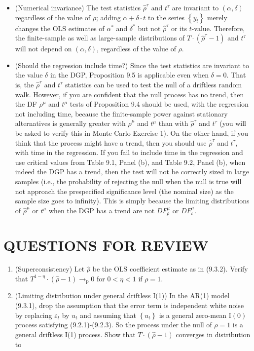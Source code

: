 \documentclass[10pt]{article}
\begin{document}
\begin{itemize}
  \item (Numerical invariance) The test statistics $\hat{\rho}^{\tau}$ and $t^{\tau}$ are invariant to $(\alpha, \delta)$ regardless of the value of $\rho$; adding $\alpha+\delta \cdot t$ to the series $\left\{y_{t}\right\}$ merely changes the OLS estimates of $\alpha^{*}$ and $\delta^{*}$ but not $\hat{\rho}^{\tau}$ or its $t$-value. Therefore, the finite-sample as well as large-sample distributions of $T \cdot\left(\hat{\rho}^{\tau}-1\right)$ and $t^{\tau}$ will not depend on $(\alpha, \delta)$, regardless of the value of $\rho$.
  \item (Should the regression include time?) Since the test statistics are invariant to the value $\delta$ in the DGP, Proposition 9.5 is applicable even when $\delta=0$. That is, the $\hat{\rho}^{\tau}$ and $t^{\tau}$ statistics can be used to test the null of a driftless random walk. However, if you are confident that the null process has no trend, then the DF $\rho^{\mu}$ and $t^{\mu}$ tests of Proposition 9.4 should be used, with the regression not including time, because the finite-sample power against stationary alternatives is generally greater with $\hat{\rho}^{\mu}$ and $t^{\mu}$ than with $\hat{\rho}^{\tau}$ and $t^{\tau}$ (you will be asked to verify this in Monte Carlo Exercise 1). On the other hand, if you think that the process might have a trend, then you should use $\hat{\rho}^{\tau}$ and $t^{\tau}$, with time in the regression. If you fail to include time in the regression and use critical values from Table 9.1, Panel (b), and Table 9.2, Panel (b), when indeed the DGP has a trend, then the test will not be correctly sized in large samples (i.e., the probability of rejecting the null when the null is true will not approach the prespecified significance level (the nominal size) as the sample size goes to infinity). This is simply because the limiting distributions of $\hat{\rho}^{\mu}$ or $t^{\mu}$ when the DGP has a trend are not $D F_{\rho}^{\mu}$ or $D F_{t}^{\mu}$.
\end{itemize}

\section*{QUESTIONS FOR REVIEW}
\begin{enumerate}
  \item (Superconsistency) Let $\hat{\rho}$ be the OLS coefficient estimate as in (9.3.2). Verify that $T^{1-\eta} \cdot(\hat{\rho}-1) \rightarrow_{\mathrm{p}} 0$ for $0<\eta<1$ if $\rho=1$.
  \item (Limiting distribution under general driftless I(1)) In the AR(1) model (9.3.1), drop the assumption that the error term is independent white noise by replacing $\varepsilon_{t}$ by $u_{t}$ and assuming that $\left\{u_{t}\right\}$ is a general zero-mean $\mathrm{I}(0)$ process satisfying (9.2.1)-(9.2.3). So the process under the null of $\rho=1$ is a general driftless I(1) process. Show that $T \cdot(\hat{\rho}-1)$ converges in distribution to
\end{enumerate}
\end{document}
